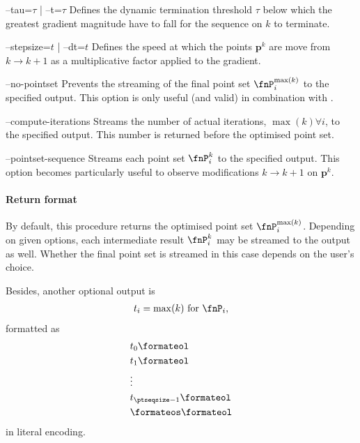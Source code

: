 \begin{procarg}{--tau=$\tau$ | --t=$\tau$}
  Defines the dynamic termination threshold $\tau$ below which the greatest gradient magnitude have to fall for the sequence on $k$ to terminate.
\end{procarg}

\begin{procarg}{--stepsize=$t$ | --dt=$t$}
  Defines the speed at which the points $\bm p^k$ are move from $k \rightarrow k+1$ as a multiplicative factor applied to the gradient.
\end{procarg}

\begin{procarg}{--no-pointset}
  Prevents the streaming of the final point set $\fnP_i^{\max(k)}$ to the specified output. This option is only useful (and valid) in combination with .
\end{procarg}

\begin{procarg}{--compute-iterations}
  Streams the number of actual iterations, $\max(k) \forall i$, to the specified output. This number is returned before the optimised point set.
\end{procarg}

\begin{procarg}{--pointset-sequence}
  Streams each point set $\fnP_i^k$ to the specified output. This option becomes particularly useful to observe modifications $k \rightarrow k+1$ on $\bm p^k$.
\end{procarg}

\procargdelimiter

\procargsilent

\paragraph{Return format}

By default, this procedure returns the optimised point set $\fnP_i^{\max(k)}$. Depending on given options, each intermediate result $\fnP_i^k$ may be streamed to the output as well. Whether the final point set is streamed in this case depends on the user's choice. 

Besides, another optional output is
\begin{align*}
  t_i = \max(k)\ \text{for}\ \fnP_i,
\end{align*}
formatted as
\begin{align*}
  &t_0\formateol\\
  &t_1\formateol\\
  &\vdots \\
  &t_{\ptseqsize-1}\formateol\\
  &\formateos\formateol
\end{align*}
in literal encoding.
